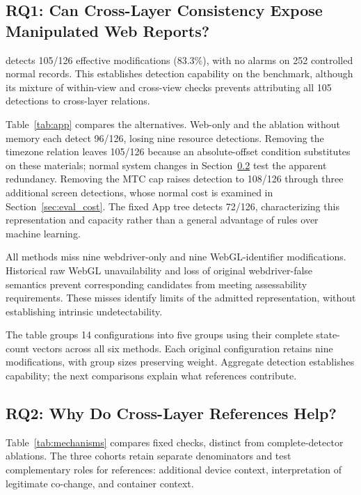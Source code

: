 \subsection{RQ1: Can Cross-Layer Consistency Expose Manipulated Web Reports?}

\full detects 105/126 effective modifications (83.3\%), with no alarms on 252 controlled normal records. This establishes detection capability on the benchmark, although its mixture of within-view and cross-view checks prevents attributing all 105 detections to cross-layer relations.

Table~\ref{tab:app} compares the alternatives. Web-only and the ablation without memory each detect 96/126, losing nine resource detections. Removing the timezone relation leaves 105/126 because an absolute-offset condition substitutes on these materials; normal system changes in Section~\ref{sec:eval_references} test the apparent redundancy. Removing the MTC cap raises detection to 108/126 through three additional screen detections, whose normal cost is examined in Section~\ref{sec:eval_cost}. The fixed App tree detects 72/126, characterizing this representation and capacity rather than a general advantage of rules over machine learning.

All methods miss nine webdriver-only and nine WebGL-identifier modifications. Historical raw WebGL unavailability and loss of original webdriver-false semantics prevent corresponding candidates from meeting assessability requirements. These misses identify limits of the admitted representation, without establishing intrinsic undetectability.

The table groups 14 configurations into five groups using their complete state-count vectors across all six methods. Each original configuration retains nine modifications, with group sizes preserving weight. Aggregate detection establishes capability; the next comparisons explain what references contribute.

\subsection{RQ2: Why Do Cross-Layer References Help?}
\label{sec:eval_references}

Table~\ref{tab:mechanisms} compares fixed checks, distinct from complete-detector ablations. The three cohorts retain separate denominators and test complementary roles for references: additional device context, interpretation of legitimate co-change, and container context.

